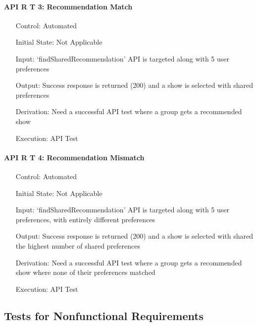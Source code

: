 \documentclass[12pt, titlepage]{article}
\begin{document}
\paragraph*{API R T 3: Recommendation Match}
\begin{itemize}
	\item[Control:] Automated
	\item[Initial State:] Not Applicable
	\item[Input:] `findSharedRecommendation' API is targeted along with 5 user preferences
	\item[Output:] Success response is returned (200) and a show is selected with shared preferences
	\item[Derivation:] Need a successful API test where a group gets a recommended show
	\item[Execution:] API Test
\end{itemize}

\paragraph*{API R T 4: Recommendation Mismatch}
\begin{itemize}
	\item[Control:] Automated
	\item[Initial State:] Not Applicable
	\item[Input:] `findSharedRecommendation' API is targeted along with 5 user preferences, with entirely different preferences
	\item[Output:] Success response is returned (200) and a show is selected with shared the highest number of shared preferences
	\item[Derivation:] Need a successful API test where a group gets a recommended show where none of their preferences matched
	\item[Execution:] API Test
\end{itemize}

\subsection{Tests for Nonfunctional Requirements}


\end{document}
